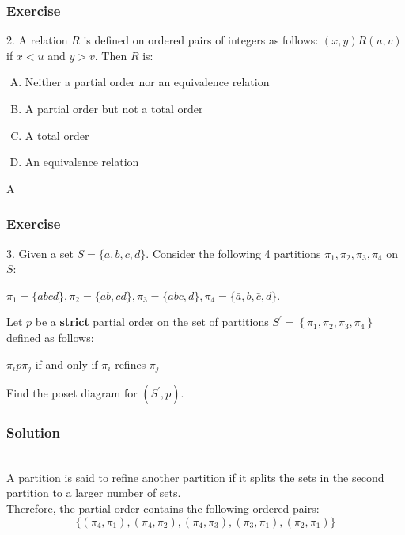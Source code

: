 \documentclass{beamer}
\begin{document}
\begin{frame}
    \frametitle{Exercise}
    2.  A relation $R$ is defined on ordered pairs of integers as follows: $(x,y) R(u,v)$ if $x < u$ and $y > v$. Then $R$ is:
    \begin{enumerate}[(A)]
        \item Neither a partial order nor an equivalence relation
        \item A partial order but not a total order
        \item A total order
        \item An equivalence relation
    \end{enumerate}
    \vs{2em}
     A
\end{frame}
\begin{frame}
    \frametitle{Exercise}
    3. Given a set $S=\{a, b, c, d\} .$ Consider the following 4 partitions 
    $\pi_{1}, \pi_{2}, \pi_{3}, \pi_{4}$ on $S$: 
    \begin{center}
        $\pi_{1}=\{\overline{a b c d}\}, \pi_{2}=\{\overline{a b}, \overline{c d}\}, \pi_{3}=\{\overline{a b c}, \bar{d}\}, \pi_{4}=\{\bar{a}, \bar{b}, \bar{c}, \bar{d}\} .$ \\
    \end{center}
    \hh Let $p$ be a \textbf{strict} partial order on the set of partitions $S^{\prime}=\left\{\pi_{1}, \pi_{2}, \pi_{3}, \pi_{4}\right\}$ defined as follows: 
    \begin{center}
        $\pi_{i} p \pi_{j}$ if and only if $\pi_{i}$ refines $\pi_{j}$\\ 
    \end{center}
    \hh Find the poset diagram for $\left(S^{\prime}, p\right)$. 
\end{frame}
\begin{frame}
    \frametitle{Solution}
        \\\hh A partition is said to refine another partition if it splits the sets 
        in the second partition to a larger number of sets.
        \\\hh Therefore, the partial order contains the following ordered pairs: 
        $$\{(\pi_4,\pi_1),(\pi_4,\pi_2),(\pi_4,\pi_3),(\pi_3,\pi_1),(\pi_2,\pi_1)\}$$        
\end{frame}
\end{document}
